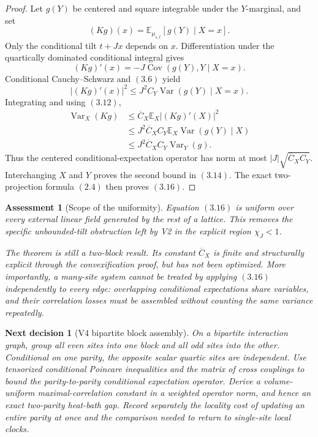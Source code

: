 \documentclass[11pt]{article}
\newtheorem{decision}[theorem]{Next decision}
\newtheorem{assessment}[theorem]{Assessment}
\theoremstyle{remark}
\begin{document}
\begin{proof}
Let \(g(Y)\) be centered and square integrable under the
\(Y\)-marginal, and set
\[
 (Kg)(x)=\mathbb E_{\mu_{s,t}}[g(Y)\mid X=x].
\]
Only the conditional tilt \(t+Jx\) depends on \(x\).
Differentiation under the quartically dominated conditional
integral gives
\[
 (Kg)'(x)=-J\operatorname{Cov}(g(Y),Y\mid X=x).               \tag{3.17}
\]
Conditional Cauchy--Schwarz and \((3.6)\) yield
\[
 |(Kg)'(x)|^2
 \le J^2C_Y\operatorname{Var}(g(Y)\mid X=x).                  \tag{3.18}
\]
Integrating and using \((3.12)\),
\[
 \begin{split}
 \operatorname{Var}_X(Kg)
 &\le\overline C_X\mathbb E_X|(Kg)'(X)|^2\\
 &\le J^2\overline C_XC_Y
       \mathbb E_X\operatorname{Var}(g(Y)\mid X)\\
 &\le J^2\overline C_XC_Y\operatorname{Var}_Y(g).             \tag{3.19}
 \end{split}
\]
Thus the centered conditional-expectation operator has norm at
most \(|J|\sqrt{\overline C_XC_Y}\).  Interchanging \(X\) and
\(Y\) proves the second bound in \((3.14)\).
The exact two-projection formula \((2.4)\) then proves
\((3.16)\).
\end{proof}

\begin{assessment}[Scope of the uniformity]
\label{ass:v15v3-scope}
Equation \((3.16)\) is uniform over every external linear field
generated by the rest of a lattice.  This removes the specific
unbounded-tilt obstruction left by V2 in the explicit region
\(\chi_J<1\).

The theorem is still a two-block result.  Its constant
\(\overline C_X\) is finite and structurally explicit through the
convexification proof, but has not been optimized.  More
importantly, a many-site system cannot be treated by applying
\((3.16)\) independently to every edge: overlapping conditional
expectations share variables, and their correlation losses must be
assembled without counting the same variance repeatedly.
\end{assessment}

\begin{decision}[V4 bipartite block assembly]
\label{dec:v15v3-next}
On a bipartite interaction graph, group all even sites into one
block and all odd sites into the other.  Conditional on one
parity, the opposite scalar quartic sites are independent.  Use
tensorized conditional Poincare inequalities and the matrix of
cross couplings to bound the parity-to-parity conditional
expectation operator.  Derive a volume-uniform maximal-correlation
constant in a weighted operator norm, and hence an exact
two-parity heat-bath gap.  Record separately the locality cost of
updating an entire parity at once and the comparison needed to
return to single-site local clocks.
\end{decision}
\end{document}
